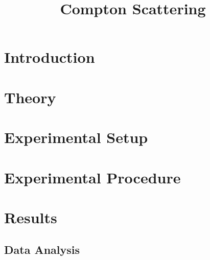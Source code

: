 \documentclass[12pt]{report}
\title{Compton Scattering}
\date{ }
\begin{document}



\tableofcontents
\listoffigures
\listoftables

\pagestyle{headings}

\pagestyle{plain}

\chapter{Introduction}



\chapter{Theory}



\chapter{Experimental Setup}

\chapter{Experimental Procedure}
\label{ch:procedure}



\chapter{Results}

\section{Data Analysis} %
\label{sec:Data Analysis}


	\begin{table}[h]
		\centering
		\begin{tabular}{|c|c|c|}
			\hline
			 
		\end{tabular}
	\end{table}
\end{document}
